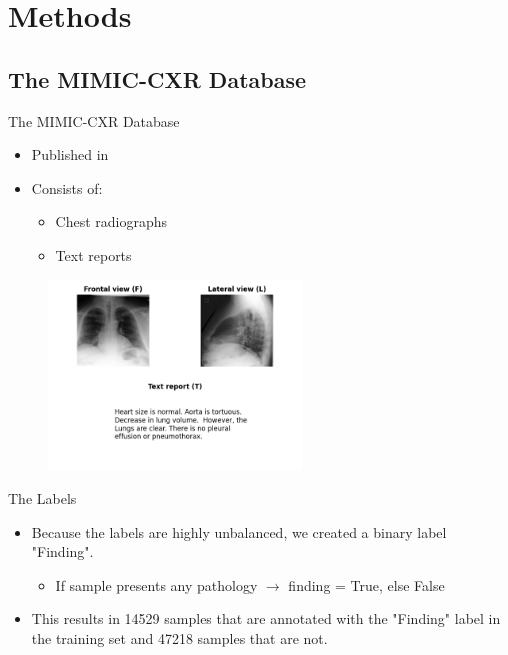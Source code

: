 \documentclass[aspectratio=169]{beamer}
\begin{document}
    \section{Methods}

    \subsection{The MIMIC-CXR Database}

    \begin{frame}{The MIMIC-CXR Database}
        \pause
        \begin{itemize}
            \item Published in \cite{johnson2019mimic}
            \item Consists of:
            \begin{itemize}
                \item Chest radiographs
                \item Text reports
            \end{itemize}

        \end{itemize}
    \end{frame}

    \begin{frame}
        \begin{figure}
            \centering
            \includegraphics[width=0.6\textwidth]{data/rand_dataset_sample.png}
        \end{figure}

    \end{frame}

    \begin{frame}{The Labels}
        \pause
        \begin{itemize}
            \item Because the labels are highly unbalanced, we created a binary label "Finding".
            \begin{itemize}
                \item If sample presents any pathology $\rightarrow$ finding = True, else False
            \end{itemize}
            \item This results in 14529 samples that are annotated with the "Finding" label in the training set and 47218 samples that are not.
        \end{itemize}
    \end{frame}
\end{document}

